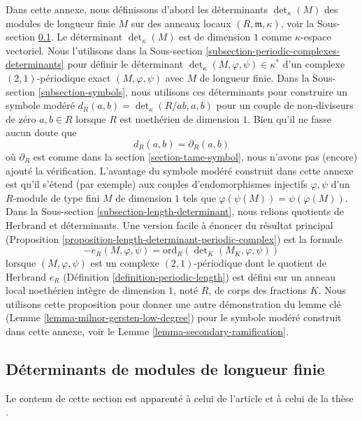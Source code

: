 \noindent
Dans cette annexe, nous définissons d'abord les déterminants $\det_\kappa(M)$
des modules de longueur finie $M$ sur des anneaux locaux $(R, \mathfrak m, \kappa)$,
voir la Sous-section \ref{subsection-determinants-finite-length}.
Le déterminant $\det_\kappa(M)$ est de dimension $1$ comme $\kappa$-espace vectoriel.
Nous l'utilisons dans la Sous-section \ref{subsection-periodic-complexes-determinants}
pour définir le déterminant $\det_\kappa(M, \varphi, \psi) \in \kappa^*$
d'un complexe $(2, 1)$-périodique exact $(M, \varphi, \psi)$
avec $M$ de longueur finie. Dans la Sous-section \ref{subsection-symbols},
nous utilisons ces déterminants pour construire un symbole modéré
$d_R(a, b) = \det_\kappa(R/ab, a, b)$ pour un couple de non-diviseurs de zéro
$a, b \in R$ lorsque $R$ est noethérien de dimension $1$.
Bien qu'il ne fasse aucun doute que
$$
d_R(a, b) = \partial_R(a, b)
$$
où $\partial_R$ est comme dans la section \ref{section-tame-symbol},
nous n'avons pas (encore) ajouté la vérification. L'avantage du
symbole modéré construit dans cette annexe est qu'il s'étend
(par exemple) aux couples d'endomorphismes injectifs $\varphi, \psi$
d'un $R$-module de type fini $M$ de dimension $1$ tels que
$\varphi(\psi(M)) = \psi(\varphi(M))$. Dans la
Sous-section \ref{subsection-length-determinant},
nous relions quotients de Herbrand et déterminants.
Une version facile à énoncer du résultat principal
(Proposition \ref{proposition-length-determinant-periodic-complex})
est la formule
$$
-e_R(M, \varphi, \psi) =
\text{ord}_R(\det\nolimits_K(M_K, \varphi, \psi))
$$
lorsque $(M, \varphi, \psi)$ est un complexe $(2, 1)$-périodique
dont le quotient de Herbrand $e_R$ (Définition \ref{definition-periodic-length})
est défini
sur un anneau local noethérien intègre de dimension $1$, noté $R$, de corps des fractions $K$.
Nous utilisons cette proposition pour donner une autre démonstration du lemme clé
(Lemme \ref{lemma-milnor-gersten-low-degree})
pour le symbole modéré construit dans cette annexe, voir le
Lemme \ref{lemma-secondary-ramification}.


\subsection{Déterminants de modules de longueur finie}
\label{subsection-determinants-finite-length}

\noindent
Le contenu de cette section est apparenté à celui de
l'article \cite{determinant} et à celui de la
thèse \cite{Joe}.

